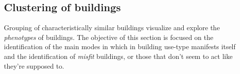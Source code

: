 \subsection{Clustering of buildings}
\label{sec:clustering}

Grouping of characteristically similar buildings visualize and explore the \emph{phenotypes} of buildings. The objective of this section is focused on the identification of the main modes in which in building use-type manifests itself and the identification of \emph{misfit} buildings, or those that don't seem to act like they're supposed to.